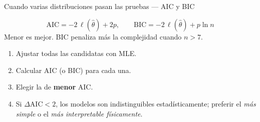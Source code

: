 \documentclass[aspectratio=1610, 10pt]{beamer}
\begin{document}
\begin{frame}{Cuando varias distribuciones pasan las pruebas — AIC y BIC}
  \begin{formulabox}
    \[
      \mathrm{AIC} = -2\,\ell(\hat\theta) + 2p,\qquad
      \mathrm{BIC} = -2\,\ell(\hat\theta) + p\ln n
    \]
    Menor es mejor. BIC penaliza más la complejidad cuando $n>7$.
  \end{formulabox}

  \begin{metodobox}
    \small
    \begin{enumerate}\itemsep1pt
      \item Ajustar todas las candidatas con MLE.
      \item Calcular AIC (o BIC) para cada una.
      \item Elegir la de \textbf{menor} AIC.
      \item Si $\Delta\mathrm{AIC}<2$, los modelos son indistinguibles estadísticamente;
            preferir el \emph{más simple} o el \emph{más interpretable físicamente}.
    \end{enumerate}
  \end{metodobox}
\end{frame}

\end{document}

